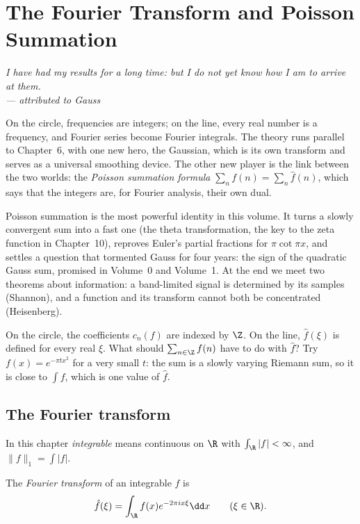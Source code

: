 \chapter{The Fourier Transform and Poisson Summation}

\begin{center}\itshape
I have had my results for a long time: but I do not yet know how I am to arrive at them.\\
\upshape --- attributed to Gauss
\end{center}

On the circle, frequencies are integers; on the line, every real number is a frequency, and Fourier series become
Fourier integrals. The theory runs parallel to Chapter~6, with one new hero, the Gaussian, which is its own transform and
serves as a universal smoothing device. The other new player is the link between the two worlds: the \emph{Poisson
summation formula} $\sum_nf(n)=\sum_n\hat f(n)$, which says that the integers are, for Fourier analysis, their own dual.

Poisson summation is the most powerful identity in this volume. It turns a slowly convergent sum into a fast one (the theta
transformation, the key to the zeta function in Chapter~10), reproves Euler's partial fractions for $\pi\cot\pi x$, and settles
a question that tormented Gauss for four years: the sign of the quadratic Gauss sum, promised in Volume~0 and Volume~1. At the
end we meet two theorems about information: a band-limited signal is determined by its samples (Shannon), and a function
and its transform cannot both be concentrated (Heisenberg).

\begin{think}
On the circle, the coefficients $c_n(f)$ are indexed by $\Z$. On the line, $\hat f(\xi)$ is defined for every real $\xi$. What
should $\sum_{n\in\Z}f(n)$ have to do with $\hat f$? Try $f(x)=e^{-\pi tx^2}$ for a very small $t$: the sum is a slowly varying Riemann
sum, so it is close to $\int f$, which is one value of $\hat f$.
\end{think}

\section{The Fourier transform}

In this chapter \emph{integrable} means continuous on $\R$ with $\int_{\R}|f|<\infty$, and $\|f\|_1=\int|f|$.

\begin{definition}
The \emph{Fourier transform} of an integrable $f$ is
\[
\hat f(\xi)=\int_{\R}f(x)e^{-2\pi ix\xi}\dd x\qquad(\xi\in\R).
\]
\end{definition}


